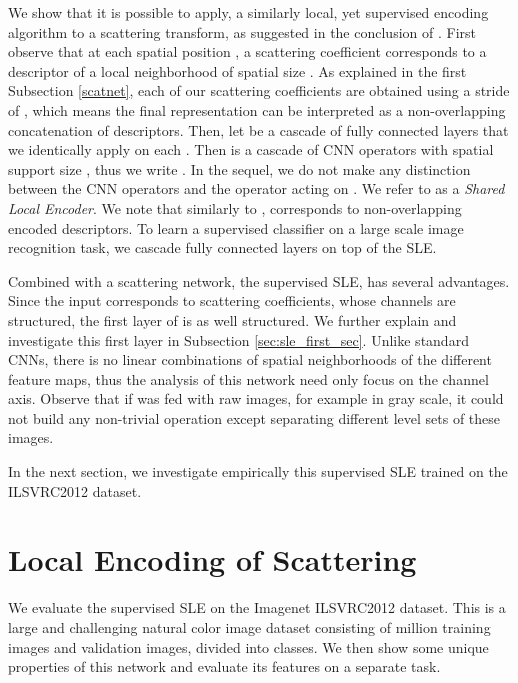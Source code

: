 \documentclass[10pt,twocolumn,letterpaper]{article}
\begin{document}
We show that it is possible to apply, a similarly local, yet supervised encoding algorithm to a scattering transform, as suggested in the conclusion of \cite{perronnin2015fisher}. First observe that at each spatial position , a scattering coefficient  corresponds to a descriptor of a local neighborhood of spatial size . As explained in the first Subsection \ref{scatnet}, each of our scattering coefficients are obtained using a stride of , which means the final representation can be interpreted as a non-overlapping concatenation of  descriptors. Then, let   be   a cascade of fully connected layers that we identically apply on each .  Then  is a cascade of CNN  operators with spatial support size , thus we write . In the sequel, we do not make any distinction between the  CNN operators and the operator acting on . We refer to  as a \textit{Shared Local Encoder}. We note that similarly to ,  corresponds to non-overlapping encoded descriptors. To learn a supervised classifier on a large scale image recognition task, we cascade fully connected layers on top of the SLE.

Combined with a scattering network, the supervised SLE, has several advantages. Since the input corresponds to scattering coefficients, whose channels are structured, the first layer of  is as well structured. We further explain and investigate this first layer in Subsection \ref{sec:sle_first_sec}. Unlike standard CNNs, there is no linear combinations of spatial neighborhoods of the different feature maps, thus the analysis of this network need only focus on the channel axis.  Observe that if  was fed with raw images, for example in gray scale, it could not build any non-trivial operation except separating different level sets of these images.  


In the next section, we investigate empirically this supervised SLE trained on the ILSVRC2012 dataset.















 





\section{Local Encoding of Scattering}
\label{sle_sec}
We evaluate the supervised SLE on the Imagenet ILSVRC2012 dataset. This is a large and challenging natural color image dataset consisting of  million training images and  validation images, divided into  classes. We then show some unique properties of this network and evaluate its features on a separate task.
\end{document}
